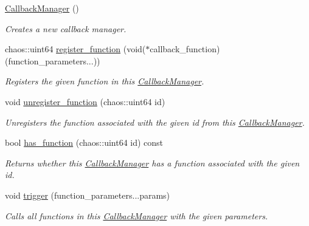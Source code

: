 \begin{DoxyCompactItemize}
\item 
\hypertarget{classsigma_1_1core_1_1_callback_manager_addca93c8df2c8e419fd6a24bd00b215e}{}\hyperlink{classsigma_1_1core_1_1_callback_manager_addca93c8df2c8e419fd6a24bd00b215e}{Callback\+Manager} ()\label{classsigma_1_1core_1_1_callback_manager_addca93c8df2c8e419fd6a24bd00b215e}

\begin{DoxyCompactList}\small\item\em Creates a new callback manager. \end{DoxyCompactList}\item 
chaos\+::uint64 \hyperlink{classsigma_1_1core_1_1_callback_manager_a7dbb06902d49789afc466a3ecbacbfe2}{register\+\_\+function} (void($\ast$callback\+\_\+function)(function\+\_\+parameters...))
\begin{DoxyCompactList}\small\item\em Registers the given function in this \hyperlink{classsigma_1_1core_1_1_callback_manager}{Callback\+Manager}. \end{DoxyCompactList}\item 
void \hyperlink{classsigma_1_1core_1_1_callback_manager_a1a03ab9185e131aa077c6528e6d2dcd8}{unregister\+\_\+function} (chaos\+::uint64 id)
\begin{DoxyCompactList}\small\item\em Unregisters the function associated with the given id from this \hyperlink{classsigma_1_1core_1_1_callback_manager}{Callback\+Manager}. \end{DoxyCompactList}\item 
\hypertarget{classsigma_1_1core_1_1_callback_manager_ad0d7c7aed410522b26005713268a845e}{}bool \hyperlink{classsigma_1_1core_1_1_callback_manager_ad0d7c7aed410522b26005713268a845e}{has\+\_\+function} (chaos\+::uint64 id) const \label{classsigma_1_1core_1_1_callback_manager_ad0d7c7aed410522b26005713268a845e}

\begin{DoxyCompactList}\small\item\em Returns whether this \hyperlink{classsigma_1_1core_1_1_callback_manager}{Callback\+Manager} has a function associated with the given id. \end{DoxyCompactList}\item 
\hypertarget{classsigma_1_1core_1_1_callback_manager_a99e53211fc575dbd72711e8318469ad1}{}void \hyperlink{classsigma_1_1core_1_1_callback_manager_a99e53211fc575dbd72711e8318469ad1}{trigger} (function\+\_\+parameters...\+params)\label{classsigma_1_1core_1_1_callback_manager_a99e53211fc575dbd72711e8318469ad1}

\begin{DoxyCompactList}\small\item\em Calls all functions in this \hyperlink{classsigma_1_1core_1_1_callback_manager}{Callback\+Manager} with the given parameters. \end{DoxyCompactList}\end{DoxyCompactItemize}
